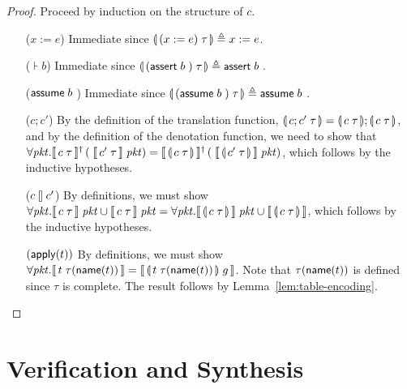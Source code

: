 \begin{proof}

  Proceed by induction on the structure of $c$.
  \begin{enumerate}[align=left]
  \item[($x:=e$)] Immediate since $\llparenthesis\, (x:=e)\; \tau\, \rrparenthesis \triangleq x := e$.
  \item[($\assert b$)] Immediate since $\llparenthesis\, (\mathsf{assert}\; b\;)\; \tau\, \rrparenthesis \triangleq \mathsf{assert}\; b\;$.
  \item[($\mathsf{assume}\; b\;$)] Immediate since $\llparenthesis\, (\mathsf{assume}\; b\;)\; \tau\, \rrparenthesis \triangleq \mathsf{assume}\; b\;$.
  \item[($c;c'$)] By the definition of the translation function,
    $\llparenthesis\, c;c'\; \tau\, \rrparenthesis = \llparenthesis\, c\; \tau\, \rrparenthesis;\llparenthesis\, c\;\tau\, \rrparenthesis$,
    and by the definition of the denotation function, we need to show
    that
    $\forall \mathit{pkt}. \llbracket\,c\; \tau\,\rrbracket^\dag\left(\;\llbracket\,c'\;
        \tau\,\rrbracket\;\mathit{pkt}\right) = \llbracket\,\llparenthesis\, c\;
        \tau\, \rrparenthesis\,\rrbracket^\dag\left(\;\llbracket\,\llparenthesis\, c'\; \tau\, \rrparenthesis\,\rrbracket\;\mathit{pkt}\right)$,
    which follows by the inductive hypotheses.
  \item[($c \talloblong c'$)] By definitions, we must show
    $\forall \mathit{pkt}. \llbracket\,c\; \tau\,\rrbracket\; \mathit{pkt} \cup \llbracket\,c\; \tau\,\rrbracket\;
    \mathit{pkt} = \forall \mathit{pkt}. \llbracket\,\llparenthesis\, c\; \tau\, \rrparenthesis\,\rrbracket\; \mathit{pkt} \cup
    \llbracket\,\llparenthesis\, c\; \tau\, \rrparenthesis\,\rrbracket$, which follows by the inductive
    hypotheses.
  \item[$(\mathsf{apply}(t))$] By definitions, we must show
    $\forall \mathit{pkt}. \llbracket\,t\; \tau(\mathsf{name}(t))\,\rrbracket = \llbracket\,\llparenthesis\, t\;
        \tau(\mathsf{name}(t))\, \rrparenthesis\; g\,\rrbracket$. Note that $\tau(\mathsf{name}(t))$ is defined since $\tau$ is
    complete. The result follows by Lemma~\ref{lem:table-encoding}.
  \end{enumerate}
\end{proof}


\section{Verification and Synthesis}


